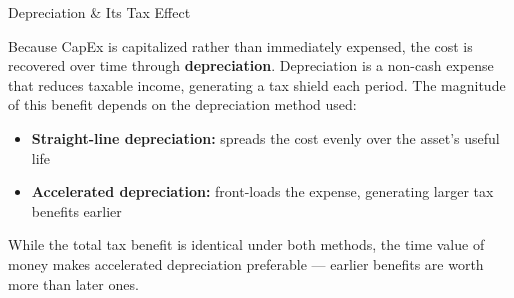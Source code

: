 \documentclass[10pt]{article}
\begin{document}
    \begin{core}{Depreciation \& Its Tax Effect}

      Because CapEx is capitalized rather than immediately expensed, the cost is recovered over time through \textbf{depreciation}. Depreciation is a non-cash expense that reduces taxable income, generating a tax shield each period. The magnitude of this benefit depends on the depreciation method used:

      \begin{itemize}

        \item \textbf{Straight-line depreciation:} spreads the cost evenly over the asset's useful life

        \item \textbf{Accelerated depreciation:} front-loads the expense, generating larger tax benefits earlier

      \end{itemize}

      While the total tax benefit is identical under both methods, the time value of money makes accelerated depreciation preferable — earlier benefits are worth more than later ones.


    \end{core}
\end{document}

